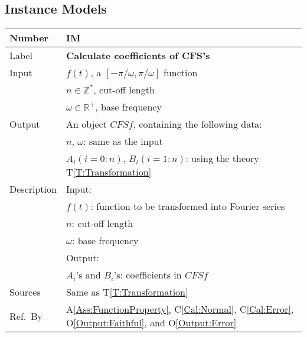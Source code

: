 \documentclass[12pt]{article}
\newcommand{\colAwidth}{0.13\textwidth}
\newcommand{\colBwidth}{0.82\textwidth}
\newcommand{\tref}[1]{T\ref{#1}}
\newcommand{\aref}[1]{A\ref{#1}}
\newcommand{\calref}[1]{C\ref{#1}}
\newcommand{\oref}[1]{O\ref{#1}}
\newcounter{instnum} %
\begin{document}
\subsection{Instance Models}
\noindent
\begin{minipage}{\textwidth}
	\renewcommand*{\arraystretch}{1.5}
	\begin{tabular}{| p{\colAwidth} | p{\colBwidth}|}
		\hline
		\rowcolor[gray]{0.9}
		Number& IM{instnum}\theinstnum \label{IM:CFScoeff}\\
		\hline
		Label& \bf Calculate coefficients of CFS's\\
		\hline
		Input& $f(t)$, a $[-\pi/\omega, \pi/\omega]$ function\\
			& $n\in\mathbb{Z}^{*}$, cut-off length\\
			& $\omega\in\mathbb{R}^{+}$, base frequency\\
		\hline
		Output& An object $\mathit{CFSf}$, containing the following data:\\
		&$n$, $\omega$: same as the input\\
		&$A_i (i=0:n)$, $B_i (i=1:n)$: using the theory \tref{T:Transformation}\\
		\hline
		Description&Input:\\
		&$f(t)$: function to be transformed into Fourier series\\
		& $n$: cut-off length\\
		& $\omega$: base frequency\\
		&Output:\\
		&$A_i$'s and $B_i$'s: coefficients in $\mathit{CFSf}$\\
		\hline
		Sources&Same as \tref{T:Transformation}		\\
		\hline
		Ref.\ By & \aref{Ass:FunctionProperty}, \calref{Cal:Normal}, \calref{Cal:Error},  \oref{Output:Faithful}, and \oref{Output:Error}
		
		
		\\
		\hline
	\end{tabular}
\end{minipage}\\
~\newline
\end{document}

